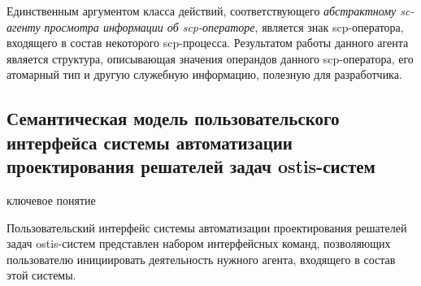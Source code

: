 Единственным аргументом класса действий, соответствующего \textit{абстрактному sc-агенту просмотра информации об scp-операторе}, является знак scp-оператора, входящего в состав некоторого scp-процесса. Результатом работы данного агента является структура, описывающая значения операндов данного scp-оператора, его атомарный тип и другую служебную информацию, полезную для разработчика.

\subsection{Семантическая модель пользовательского интерфейса системы автоматизации проектирования решателей задач ostis-систем}
\begin{SCn}
\bigskip

\begin{scnrelfromlist}{ключевое понятие}
\end{scnrelfromlist}
\end{SCn}
\label{sub_sec_interface_ps_des_auto_sys}
Пользовательский интерфейс системы автоматизации проектирования решателей задач ostis-систем представлен набором интерфейсных команд, позволяющих пользователю инициировать деятельность нужного агента, входящего в состав этой системы.

